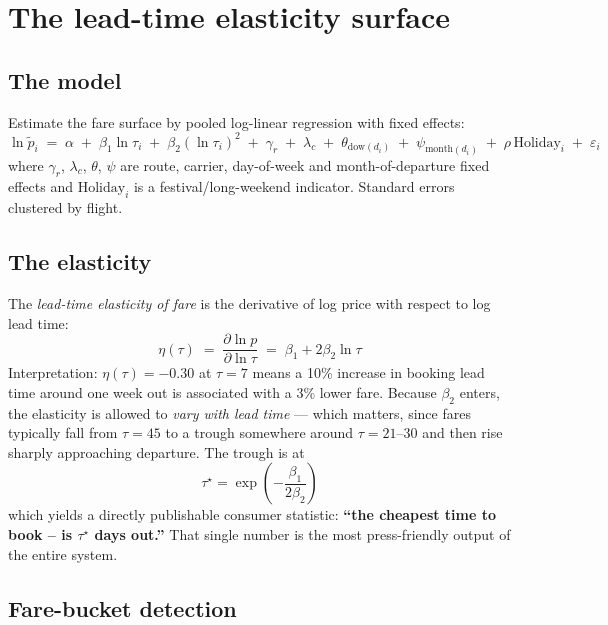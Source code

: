 \section{The lead-time elasticity surface}

\subsection{The model}

Estimate the fare surface by pooled log-linear regression with fixed effects:
\begin{equation}
\ln \tilde p_{i} \;=\; \alpha
\;+\; \beta_1 \ln \tau_i
\;+\; \beta_2 (\ln \tau_i)^2
\;+\; \gamma_{r} \;+\; \lambda_{c} \;+\; \theta_{\text{dow}(d_i)}
\;+\; \psi_{\text{month}(d_i)}
\;+\; \rho\,\text{Holiday}_i
\;+\; \varepsilon_i
\end{equation}
where $\gamma_r$, $\lambda_c$, $\theta$, $\psi$ are route, carrier, day-of-week and
month-of-departure fixed effects and $\text{Holiday}_i$ is a festival/long-weekend
indicator. Standard errors clustered by flight.

\subsection{The elasticity}

The \emph{lead-time elasticity of fare} is the derivative of log price with respect to log
lead time:
\begin{equation}
\boxed{\;\eta(\tau) \;=\; \frac{\partial \ln p}{\partial \ln \tau} \;=\; \beta_1 + 2\beta_2\ln\tau\;}
\end{equation}
Interpretation: $\eta(\tau) = -0.30$ at $\tau=7$ means a 10\% increase in booking lead time
around one week out is associated with a 3\% lower fare. Because $\beta_2$ enters, the
elasticity is allowed to \emph{vary with lead time} --- which matters, since fares typically
fall from $\tau=45$ to a trough somewhere around $\tau=21$--$30$ and then rise sharply
approaching departure. The trough is at
\begin{equation}
\tau^\star = \exp\!\left(-\frac{\beta_1}{2\beta_2}\right)
\end{equation}
which yields a directly publishable consumer statistic: \textbf{``the cheapest time to book
-- is $\tau^\star$ days out.''} That single number is the most
press-friendly output of the entire system.

\subsection{Fare-bucket detection}

